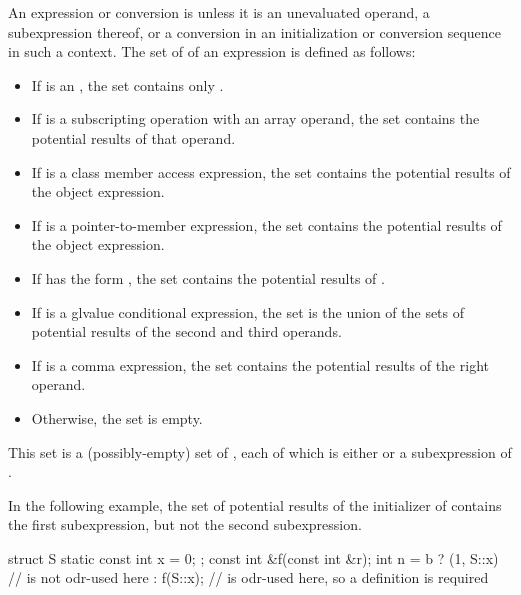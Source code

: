 \pnum
{}%
An expression or conversion is  unless it is
an unevaluated operand,
a subexpression thereof, or
a conversion in an initialization or conversion sequence in such a context.
The set of  of an expression  is
defined as follows:
\begin{itemize}
\item If  is an
, the set
contains only .
\item If  is a subscripting operation with
an array operand, the set contains the potential results of that operand.
\item If  is a class member access
expression, the set contains the potential results of
the object expression.
\item If  is a pointer-to-member
expression,
the set contains the potential results of the object expression.
\item If  has the form , the set contains the
potential results of .
\item If  is a glvalue conditional
expression, the set is the union of the sets of
potential results of the second and third operands.
\item If  is a comma expression, the set
contains the potential results of the right operand.
\item Otherwise, the set is empty.
\end{itemize}
\begin{note}
This set is a (possibly-empty) set of ,
each of which is either  or a subexpression of .
\begin{example}
In the following example, the set of potential results of the initializer
of  contains the first  subexpression, but not the second
 subexpression.
\begin{codeblock}
struct S { static const int x = 0; };
const int &f(const int &r);
int n = b ? (1, S::x)           //  is not odr-used here
          : f(S::x);            //  is odr-used here, so a definition is required
\end{codeblock}
\end{example}
\end{note}

